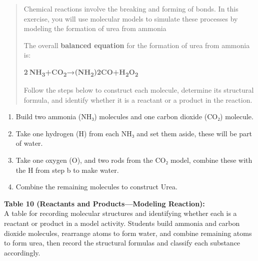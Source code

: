 \documentclass[
  letterpaper,
  DIV=11,
  numbers=noendperiod]{scrreprt}
\begin{document}
\begin{quote}
Chemical reactions involve the breaking and forming of bonds. In this
exercise, you will use molecular models to simulate these processes by
modeling the formation of urea from ammonia

The overall \textbf{balanced equation} for the formation of urea from
ammonia is:

\textbf{2 NH\textsubscript{3}+CO\textsubscript{2}→(NH\textsubscript{2})2CO+H\textsubscript{2}O\textsubscript{2}}

Follow the steps below to construct each molecule, determine its
structural formula, and identify whether it is a reactant or a product
in the reaction.
\end{quote}

\begin{enumerate}
\def\labelenumi{\alph{enumi}.}
\item
  Build two ammonia (NH₃) molecules and one carbon dioxide (CO₂)
  molecule.
\item
  Take one hydrogen (H) from each NH₃ and set them aside, these will be
  part of water.
\item
  Take one oxygen (O), and two rods from the CO₂ model, combine these
  with the H from step b to make water.
\item
  Combine the remaining molecules to construct Urea.
\end{enumerate}

\textbf{Table 10 (Reactants and Products---Modeling Reaction):}\\
A table for recording molecular structures and identifying whether each
is a reactant or product in a model activity. Students build ammonia and
carbon dioxide molecules, rearrange atoms to form water, and combine
remaining atoms to form urea, then record the structural formulas and
classify each substance accordingly.
\end{document}
